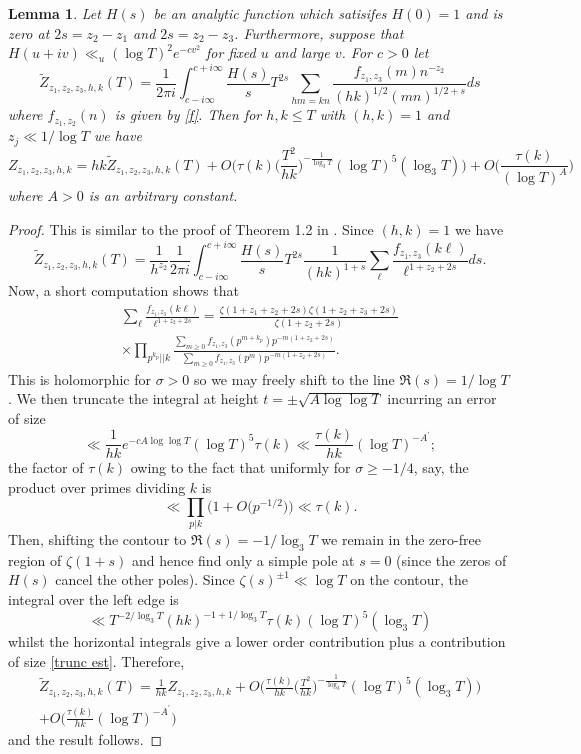 \documentclass[oneside, 12pt]{amsart}
\newtheorem{lem}[prop]{Lemma}
\theoremstyle{definition}
\newcommand{\leqs}{\leqslant }
\newcommand{\geqs}{\geqslant }
\begin{document}
\begin{lem}\label{diag lem} Let $H(s)$ be an analytic function which satisifes $H(0)=1$ and is zero at $2s=z_2-z_1$ and $2s=z_2-z_3$. Furthermore, suppose that $H(u+iv)\ll_u (\log T)^2 e^{-cv^2}$ for fixed $u$ and large $v$. For $c>0$ let 
\[
\tilde{Z}_{z_1,z_2,z_3,h,k}(T)
=
\frac{1}{2\pi i }\int_{c-i\infty}^{c+i\infty}\frac{H(s)}{s}
T^{2s}
\sum_{hm=kn}\frac{f_{z_1,z_3}(m) n^{-z_2}}{(hk)^{1/2}(mn)^{1/2+s}} ds
\] 
where $f_{z_1,z_2}(n)$ is given by \eqref{f}. Then for $h,k\leqs T$ with $(h,k)=1$ and $z_j\ll 1/\log T$ we have 
\begin{equation}\label{Z diag}
Z_{z_1,z_2,z_3,h,k}=hk\tilde{Z}_{z_1,z_2,z_3,h,k}(T)+O\Big(\tau(k)\Big(\frac{T^2}{hk}\Big)^{-\frac{1}{\log_3 T}}(\log T)^5(\log_3 T)\Big)
+O\Big(\frac{\tau(k)}{(\log T)^{A}}\Big)
\end{equation}
where $A>0$ is an arbitrary constant.
\end{lem}
\begin{proof}
This is similar to the proof of Theorem 1.2 in \cite{BBLR}. Since $(h,k)=1$ we have
\[
\tilde{Z}_{z_1,z_2,z_3,h,k}(T)=\frac{1}{h^{z_2}}\frac{1}{2\pi i }\int_{c-i\infty}^{c+i\infty}\frac{H(s)}{s}T^{2s}\frac{1}{(hk)^{1+s}}\sum_{\ell }\frac{f_{z_1,z_3}(k\ell) }{\ell^{1+z_2+2s}} ds.
\] 
Now, a short computation shows that 
\begin{multline*}
     \sum_{\ell }\frac{f_{z_1,z_3}(k\ell) }{\ell^{1+z_2+2s}}
  = 
     \frac{\zeta(1+z_1+z_2+2s)\zeta(1+z_2+z_3+2s)}{\zeta(1+z_2+2s)}     
  \\
     \times
     \prod_{p^{k_p} || k}\frac{\sum_{m\geqs 0}f_{z_1,z_3}(p^{m+k_p})p^{-m(1+z_2+2s)}}{\sum_{m\geqs 0}f_{z_1,z_3}(p^{m})p^{-m(1+z_2+2s)}}.
\end{multline*}
This is holomorphic for $\sigma>0$ so we may freely shift to the line $\Re(s)=1/\log T$. We then truncate the integral at height $t=\pm\sqrt{A\log\log T}$ incurring an error of size
\begin{equation}
\label{trunc est}
\ll \frac{1}{hk} e^{-cA\log\log T}(\log T)^5 \tau(k)\ll \frac{\tau(k)}{hk}(\log T)^{-A^\prime};
\end{equation}
the factor of $\tau(k)$ owing to the fact that uniformly for $\sigma\geqs -1/4$, say, the product over primes dividing $k$ is 
\[
\ll \prod_{p|k}\Big(1+O\big(p^{-1/2}\big)\Big)\ll \tau(k).
\]
Then, shifting the contour to $\Re(s)=-1/\log_3 T$ we remain in the zero-free region of $\zeta(1+s)$ and hence find only a simple pole at $s=0$ (since the zeros of $H(s)$ cancel the other poles). Since $\zeta(s)^{\pm 1} \ll \log T$ on the contour, the integral over the left edge is 
\[
\ll T^{-2/\log_3 T}(hk)^{-1+1/\log_3 T}\tau(k) (\log T)^5(\log_3 T)
\]
whilst the horizontal integrals give a lower order contribution plus a contribution of size \eqref{trunc est}. Therefore,
\begin{multline*}
\tilde{Z}_{z_1,z_2,z_3,h,k}(T)=\frac{1}{hk}Z_{z_1,z_2,z_3,h,k}+O\Big(\frac{\tau(k)}{hk}\Big(\frac{T^2}{hk}\Big)^{-\frac{1}{\log_3 T}}(\log T)^5(\log_3 T)\Big)
\\
+O\Big(\frac{\tau(k)}{hk}(\log T)^{-A^\prime}\Big)
\end{multline*}
and the result follows.
\end{proof}
\end{document}
